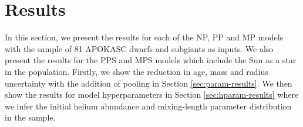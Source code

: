 \documentclass[a4paper,fleqn,usenatbib]{mnras}
\begin{document}
\section{Results}\label{sec:res}






In this section, we present the results for each of the NP, PP and MP models with the sample of 81 APOKASC dwarfs and subgiants as inputs. We also present the results for the PPS and MPS models which include the Sun as a star in the population. Firstly, we show the reduction in age, mass and radius uncertainty with the addition of pooling in Section \ref{sec:param-results}. We then show the results for model hyperparameters in Section \ref{sec:hparam-results} where we infer the initial helium abundance and mixing-length parameter distribution in the sample.
\end{document}
